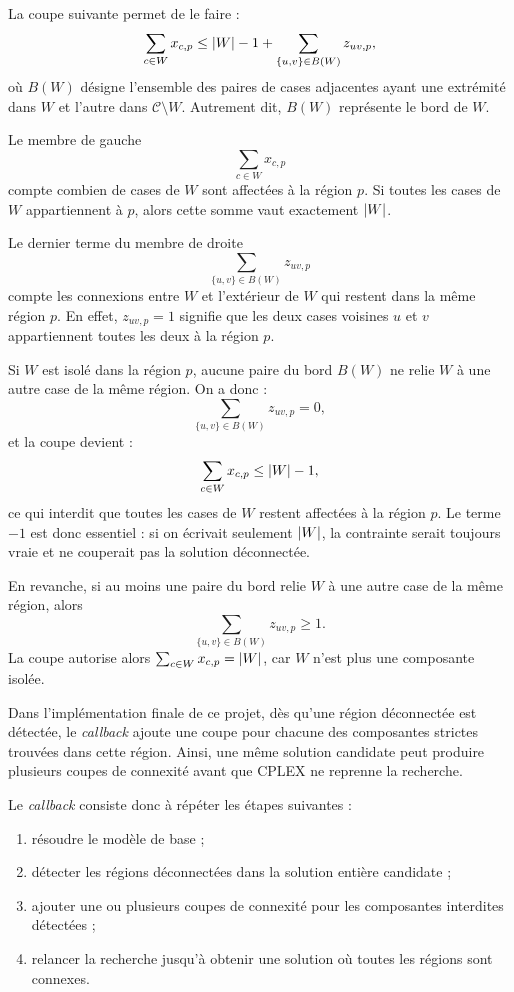 La coupe suivante permet de le faire :
\[
\sum_{c \in W} x_{c,p}
\leq
\left|W\right| - 1 + \sum_{\{u,v\} \in B(W)} z_{uv,p},
\]
où \(B(W)\) désigne l'ensemble des paires de cases adjacentes ayant une extrémité dans \(W\) et l'autre dans \(\mathcal{C} \setminus W\). Autrement dit, \(B(W)\) représente le bord de \(W\).

Le membre de gauche
\[
\sum_{c \in W} x_{c,p}
\]
compte combien de cases de \(W\) sont affectées à la région \(p\). Si toutes les cases de \(W\) appartiennent à \(p\), alors cette somme vaut exactement \(\left|W\right|\).

Le dernier terme du membre de droite
\[
\sum_{\{u,v\} \in B(W)} z_{uv,p}
\]
compte les connexions entre \(W\) et l'extérieur de \(W\) qui restent dans la même région \(p\). En effet, \(z_{uv,p}=1\) signifie que les deux cases voisines \(u\) et \(v\) appartiennent toutes les deux à la région \(p\).

Si \(W\) est isolé dans la région \(p\), aucune paire du bord \(B(W)\) ne relie \(W\) à une autre case de la même région. On a donc :
\[
\sum_{\{u,v\} \in B(W)} z_{uv,p} = 0,
\]
et la coupe devient :
\[
\sum_{c \in W} x_{c,p} \leq \left|W\right| - 1,
\]
ce qui interdit que toutes les cases de \(W\) restent affectées à la région \(p\). Le terme \(-1\) est donc essentiel : si on écrivait seulement \(\left|W\right|\), la contrainte serait toujours vraie et ne couperait pas la solution déconnectée.

En revanche, si au moins une paire du bord relie \(W\) à une autre case de la même région, alors
\[
\sum_{\{u,v\} \in B(W)} z_{uv,p} \geq 1.
\]
La coupe autorise alors \(\sum_{c \in W} x_{c,p} = \left|W\right|\), car \(W\) n'est plus une composante isolée.


Dans l'implémentation finale de ce projet, dès qu'une région déconnectée est détectée, le \textit{callback} ajoute une coupe pour chacune des composantes strictes trouvées dans cette région. Ainsi, une même solution candidate peut produire plusieurs coupes de connexité avant que CPLEX ne reprenne la recherche.

Le \textit{callback} consiste donc à répéter les étapes suivantes :
\begin{enumerate}
    \item résoudre le modèle de base ;
    \item détecter les régions déconnectées dans la solution entière candidate ;
    \item ajouter une ou plusieurs coupes de connexité pour les composantes interdites détectées ;
    \item relancer la recherche jusqu'à obtenir une solution où toutes les régions sont connexes.
\end{enumerate}

